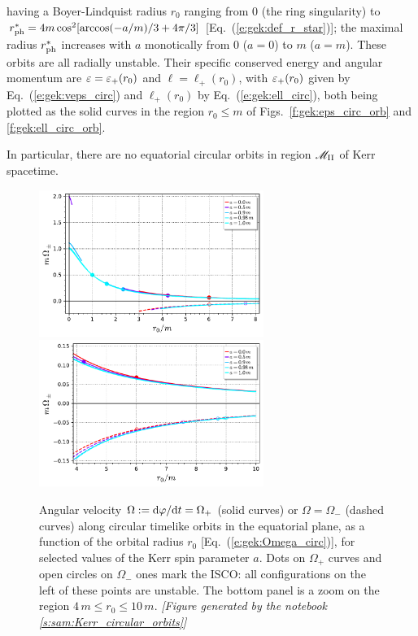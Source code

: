 \begin{greybox}
\begin{enumerate}
having a Boyer-Lindquist radius $r_0$ ranging
from $0$ (the ring singularity) to
$r_{\rm ph}^* = 4 m \cos^2[\arccos(-a/m)/3 + 4\pi/3]$
[Eq.~(\ref{e:gek:def_r_star})];
the maximal radius $r_{\rm ph}^*$ increases with $a$ monotically from $0$ ($a=0$) to $m$ ($a=m$).
These orbits are all radially unstable. Their specific conserved energy and angular momentum
are $\varepsilon = \varepsilon_+(r_0)$ and $\ell = \ell_+(r_0)$, with
$\varepsilon_+(r_0)$ given by Eq.~(\ref{e:gek:veps_circ}) and $\ell_+(r_0)$ by
Eq.~(\ref{e:gek:ell_circ}), both being plotted as the solid
curves in the region $r_0 \leq m$ of Figs.~\ref{f:gek:eps_circ_orb} and \ref{f:gek:ell_circ_orb}.
\end{enumerate}
In particular, there are no equatorial circular orbits in region $\mathscr{M}_{\rm II}$ of Kerr spacetime.
\end{greybox}


\begin{figure}
\begin{center}
\includegraphics[width=0.65\textwidth]{gek_omega_circ_orb.pdf}\\
\includegraphics[width=0.65\textwidth]{gek_omega_circ_orb_zoom.pdf}
\end{center}
\caption[]{\label{f:gek:omega_circ_orb} \footnotesize
Angular velocity $\Omega:=\mathrm{d}\varphi/\mathrm{d} t=\Omega_+$ (solid curves) or $\Omega=\Omega_-$
(dashed curves) along circular timelike
orbits in the equatorial plane, as a function of the orbital radius $r_0$
[Eq.~(\ref{e:gek:Omega_circ})], for selected values of the Kerr spin parameter $a$.
Dots on $\Omega_+$ curves and open circles on $\Omega_-$ ones mark the ISCO: all
configurations on the left of these points are unstable.
The bottom panel is a zoom on the region $4\,m \leq r_0 \leq 10\,m$.
\textsl{[Figure generated by the notebook \ref{s:sam:Kerr_circular_orbits}]}
}
\end{figure}

